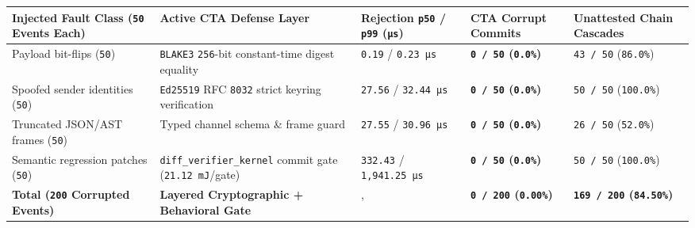 \documentclass[10pt,letterpaper]{article}
\begin{document}
{\footnotesize\setlength{\tabcolsep}{3.8pt}\renewcommand{\arraystretch}{1.15}
\begin{longtable}[]{@{}
  >{\raggedright\arraybackslash}p{}
  >{\raggedright\arraybackslash}p{}
  >{\raggedleft\arraybackslash}p{}
  >{\raggedleft\arraybackslash}p{}
  >{\raggedleft\arraybackslash}p{}@{}}
\toprule\noalign{}
\begin{minipage}[b]{\linewidth}\raggedright
\textbf{Injected Fault Class (\texttt{50} Events Each)}
\end{minipage} & \begin{minipage}[b]{\linewidth}\raggedright
\textbf{Active CTA Defense Layer}
\end{minipage} & \begin{minipage}[b]{\linewidth}\raggedleft
\textbf{Rejection \texttt{p50} / \texttt{p99} (\texttt{µs})}
\end{minipage} & \begin{minipage}[b]{\linewidth}\raggedleft
\textbf{CTA Corrupt Commits}
\end{minipage} & \begin{minipage}[b]{\linewidth}\raggedleft
\textbf{Unattested Chain Cascades}
\end{minipage} \\
\midrule\noalign{}
\endhead
\bottomrule\noalign{}
\endlastfoot
Payload bit-flips (\texttt{50}) & \texttt{BLAKE3} \texttt{256}-bit
constant-time digest equality & \texttt{0.19} / \texttt{0.23\ µs} &
\textbf{\texttt{0\ /\ 50} (\texttt{0.0\%})} & \texttt{43\ /\ 50}
(\texttt{86.0\%}) \\
Spoofed sender identities (\texttt{50}) & \texttt{Ed25519} RFC
\texttt{8032} strict keyring verification & \texttt{27.56} /
\texttt{32.44\ µs} & \textbf{\texttt{0\ /\ 50} (\texttt{0.0\%})} &
\texttt{50\ /\ 50} (\texttt{100.0\%}) \\
Truncated JSON/AST frames (\texttt{50}) & Typed channel schema \& frame
guard & \texttt{27.55} / \texttt{30.96\ µs} & \textbf{\texttt{0\ /\ 50}
(\texttt{0.0\%})} & \texttt{26\ /\ 50} (\texttt{52.0\%}) \\
Semantic regression patches (\texttt{50}) &
\texttt{diff\_\allowbreak{}verifier\_\allowbreak{}kernel} commit gate (\texttt{21.12\ mJ}/\allowbreak{}gate) &
\texttt{332.43} / \texttt{1,\allowbreak{}941.\allowbreak{}25\ µs} & \textbf{\texttt{0\ /\ 50}
(\texttt{0.0\%})} & \texttt{50\ /\ 50} (\texttt{100.0\%}) \\
\textbf{Total (\texttt{200} Corrupted Events)} & \textbf{Layered
Cryptographic + Behavioral Gate} & , & \textbf{\texttt{0\ /\ 200}
(\texttt{0.00\%})} & \textbf{\texttt{169\ /\allowbreak{}\ 200} (\texttt{84.50\%})} \\
\end{longtable}
}
\end{document}
